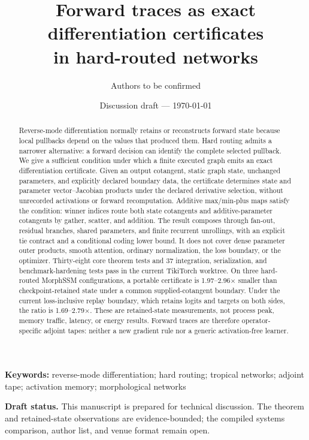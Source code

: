 \documentclass[10pt]{article}
\title{Forward traces as exact differentiation certificates\\
in hard-routed networks}
\author{Authors to be confirmed}
\date{Discussion draft --- \today}
\begin{document}
\maketitle

\begin{abstract}
Reverse-mode differentiation normally retains or reconstructs forward state
because local pullbacks depend on the values that produced them.  Hard routing
admits a narrower alternative: a forward decision can identify the complete
selected pullback.  We give a sufficient condition under which a finite
executed graph emits an exact differentiation certificate.  Given an output
cotangent, static graph state, unchanged parameters, and explicitly declared
boundary data, the certificate determines state and parameter
vector--Jacobian products under the declared derivative selection, without
unrecorded activations or forward recomputation.  Additive max/min-plus maps
satisfy the condition: winner
indices route both state cotangents and additive-parameter cotangents by
gather, scatter, and addition.  The result composes through fan-out, residual
branches, shared parameters, and finite recurrent unrollings, with an explicit
tie contract and a conditional coding lower bound.  It does not cover dense parameter
outer products, smooth attention, ordinary normalization, the loss boundary,
or the optimizer.  Thirty-eight core theorem tests and 37 integration,
serialization, and benchmark-hardening tests pass in the current TikiTorch
worktree.  On three hard-routed MorphSSM configurations, a portable certificate
is 1.97--2.96$\times$ smaller than checkpoint-retained state under a common
supplied-cotangent boundary.  Under the current loss-inclusive replay boundary,
which retains logits and targets on both sides, the ratio is
1.69--2.79$\times$.  These are retained-state measurements, not process peak,
memory traffic, latency, or energy results.  Forward traces are therefore
operator-specific adjoint tapes: neither a new gradient rule nor a generic
activation-free learner.
\end{abstract}

\noindent\textbf{Keywords:} reverse-mode differentiation; hard routing;
tropical networks; adjoint tape; activation memory; morphological networks

\medskip
\noindent\textbf{Draft status.} This manuscript is prepared for technical
discussion.  The theorem and retained-state observations are evidence-bounded;
the compiled systems comparison, author list, and venue format remain open.
\end{document}
